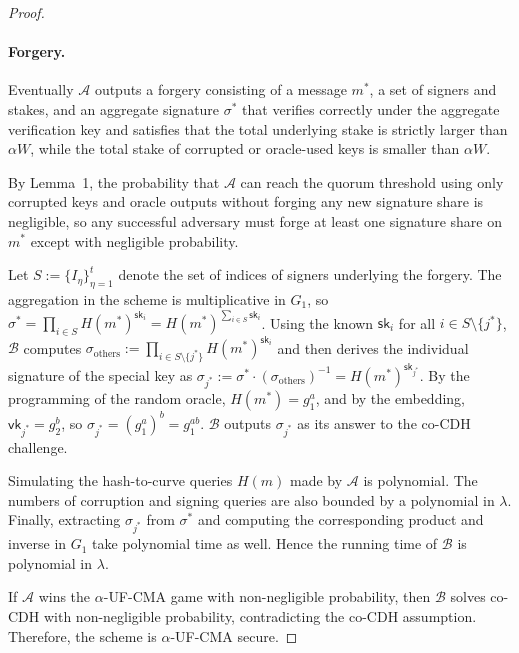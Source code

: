 \documentclass{article}
\begin{document}
\begin{proof}
\paragraph{Forgery.}
Eventually $\mathcal{A}$ outputs a forgery consisting of a message $m^\ast$, a set of signers and stakes, and an aggregate signature $\sigma^\ast$ that verifies correctly under the aggregate verification key and satisfies that the total underlying stake is strictly larger than $\alpha W$, while the total stake of corrupted or oracle-used keys is smaller than  $\alpha W$. 

By Lemma~1, the probability that $\mathcal{A}$ can reach the quorum threshold using only corrupted keys and oracle outputs without forging any new signature share is negligible, so any successful adversary must forge at least one signature share on $m^\ast$ except with negligible probability.

Let $S:=\{I_\eta\}_{\eta=1}^t$ denote the set of indices of signers underlying the forgery. The aggregation in the scheme is multiplicative in $G_1$, so $\sigma^\ast = \prod_{i \in S} H(m^\ast)^{\mathsf{sk}_i} = H(m^\ast)^{\sum_{i \in S} \mathsf{sk}_i}$. Using the known $\mathsf{sk}_i$ for all $i \in S \setminus \{j^\ast\}$, $\mathcal{B}$ computes $\sigma_{\text{others}} := \prod_{i \in S \setminus \{j^\ast\}} H(m^\ast)^{\mathsf{sk}_i}$ and then derives the individual signature of the special key as $\sigma_{j^\ast} := \sigma^\ast \cdot (\sigma_{\text{others}})^{-1} = H(m^\ast)^{\mathsf{sk}_{j^\ast}}$. By the programming of the random oracle, $H(m^\ast) = g_1^a$, and by the embedding, $\mathsf{vk}_{j^\ast} = g_2^b$, so $\sigma_{j^\ast} = (g_1^a)^b = g_1^{ab}$. $\mathcal{B}$ outputs $\sigma_{j^\ast}$ as its answer to the co-CDH challenge.

Simulating the hash-to-curve queries $H(m)$ made by $\mathcal{A}$ is polynomial. The numbers of corruption and signing queries are also bounded by a polynomial in $\lambda$. Finally, extracting $\sigma_{j^\ast}$ from $\sigma^\ast$ and computing the corresponding product and inverse in $G_1$ take polynomial time as well. Hence the running time of $\mathcal{B}$ is polynomial in $\lambda$.


If $\mathcal{A}$ wins the $\alpha$-\textsf{UF-CMA} game with non-negligible probability, then $\mathcal{B}$ solves co-CDH with non-negligible probability, contradicting the co-CDH assumption. Therefore, the scheme is $\alpha$-\textsf{UF-CMA} secure.
\end{proof}
\end{document}
